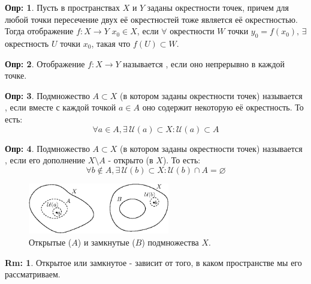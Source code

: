 \documentclass[12pt]{article}
\newcommand{\MU}{\mathcal{U}}
\newcommand{\VN}{\varnothing}
\theoremstyle{definition}
\newtheorem{defn}{Опр:}
\newtheorem{rem}{Rm:}
\begin{document}
\begin{defn}
	Пусть в пространствах $X$ и $Y$ заданы окрестности точек, причем для любой точки пересечение двух её окрестностей тоже является её окрестностью. Тогда  отображение $f\colon X \to Y$  $x_0 \in X$, если $\forall$ окрестности $W$ точки $y_0 = f(x_0), \, \exists$ окрестность $U$ точки $x_0$, такая что $f(U) \subset W$.
\end{defn}

\begin{defn}
	Отображение $f \colon X \to Y$ называется , если оно непрерывно в каждой точке.
\end{defn}

\begin{defn}
	Подмножество $A\subset X$ (в котором заданы окрестности точек) называется , если вместе с каждой точкой $a \in A$ оно содержит некоторую её окрестность. То есть:
	$$
	\forall a \in A, \exists \, \MU(a) \subset X \colon \MU(a) \subset A
	$$
\end{defn}

\begin{defn}
	Подмножество $A\subset X$ (в котором заданы окрестности точек) называется , если его дополнение $X \setminus A$ - открыто (в $X$). То есть:
	$$
		\forall b \notin A, \exists \, \MU(b) \subset X \colon \MU(b) \cap A = \VN
	$$
\end{defn}

\begin{figure}[H]
	\centering
	\includegraphics[width=0.55\textwidth]{1_9.eps}
	\caption{Открытые ($A$) и замкнутые ($B$) подмножества $X$.}
	\label{1_9}
\end{figure}
\begin{rem}
	Открытое или замкнутое - зависит от того, в каком пространстве мы его рассматриваем.
\end{rem}
\end{document}
